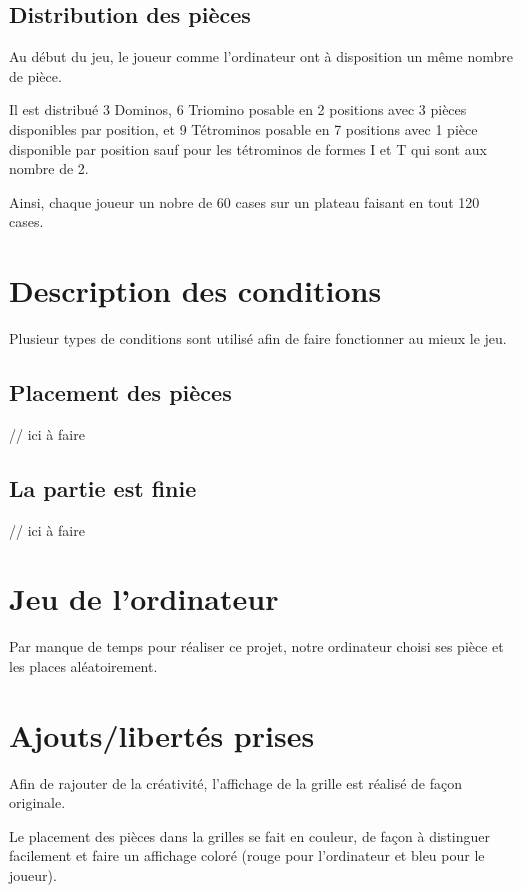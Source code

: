 \documentclass[a4paper, titlepage, french]{report}
\begin{document}
\section{Distribution des pièces}

Au début du jeu, le joueur comme l'ordinateur ont à disposition un même nombre de pièce.
\bigskip

Il est distribué 3 Dominos, 6 Triomino posable en 2 positions avec 3 pièces disponibles par position, et 9 Tétrominos posable en 7 positions avec 1 pièce disponible par position sauf pour les tétrominos de formes I et T qui sont aux nombre de 2.

Ainsi, chaque joueur un nobre de 60 cases sur un plateau faisant en tout 120 cases.

\chapter{Description des conditions}

Plusieur types de conditions sont utilisé afin de faire fonctionner au mieux le jeu.

\section{Placement des pièces}

\color{red}
// ici à faire
\color{black}


\section{La partie est finie}

\color{red}
// ici à faire
\color{black}


\chapter{Jeu de l'ordinateur}

Par manque de temps pour réaliser ce projet, notre ordinateur choisi ses pièce et les places aléatoirement.
\chapter{Ajouts/libertés prises}

Afin de rajouter de la créativité, l'affichage de la grille est réalisé de façon originale.
\bigskip

Le placement des pièces dans la grilles se fait en couleur, de façon à distinguer facilement et faire un affichage coloré (rouge pour l'ordinateur et bleu pour le joueur).
\bigskip
\end{document}
